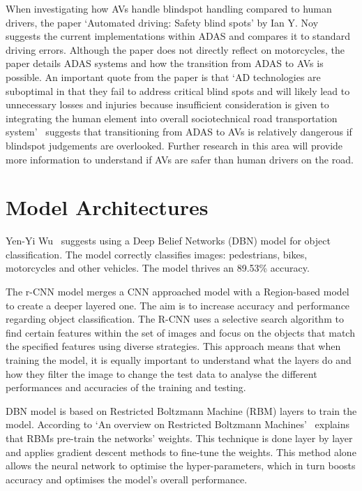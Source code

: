 \documentclass[12pt]{report} %
\begin{document}
		When investigating how AVs handle blindspot handling compared to human drivers, the paper `Automated driving: Safety blind spots' by Ian Y. Noy~\cite{noy_automated_2018} suggests the current implementations within ADAS and compares it to standard driving errors. Although the paper does not directly reflect on motorcycles, the paper details ADAS systems and how the transition from ADAS to AVs is possible. An important quote from the paper is that `AD technologies are suboptimal in that they fail to address critical blind spots and will likely lead to unnecessary losses and injuries because insufficient consideration is given to integrating the human element into overall sociotechnical road transportation system'~\cite{noy_automated_2018} suggests that transitioning from ADAS to AVs is relatively dangerous if blindspot judgements are overlooked. Further research in this area will provide more information to understand if AVs are safer than human drivers on the road.

	\section{Model Architectures}
		Yen-Yi Wu~\cite{wu_pedestrian_2016} suggests using a Deep Belief Networks (DBN) model for object classification. The model correctly classifies images: pedestrians, bikes, motorcycles and other vehicles. The model thrives an 89.53\% accuracy.

		The r-CNN model merges a CNN approached model with a Region-based model to create a deeper layered one. The aim is to increase accuracy and performance regarding object classification. The R-CNN uses a selective search algorithm to find certain features within the set of images and focus on the objects that match the specified features using diverse strategies. This approach means that when training the model, it is equally important to understand what the layers do and how they filter the image to change the test data to analyse the different performances and accuracies of the training and testing.~\cite{uijlings_selective_2013}~\cite{ren_faster_2015}

		DBN model is based on Restricted Boltzmann Machine (RBM) layers to train the model. According to `An overview on Restricted Boltzmann Machines'~\cite{zhang_overview_2018} explains that RBMs pre-train the networks' weights. This technique is done layer by layer and applies gradient descent methods to fine-tune the weights. This method alone allows the neural network to optimise the hyper-parameters, which in turn boosts accuracy and optimises the model's overall performance.
\end{document}

